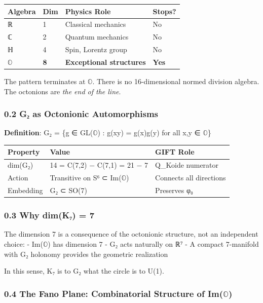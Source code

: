 \documentclass[11pt,a4paper]{article}
\begin{document}
{\def\LTcaptype{none} %
\begin{longtable}[]{@{}llll@{}}
\toprule\noalign{}
Algebra & Dim & Physics Role & Stops? \\
\midrule\noalign{}
\endhead
\bottomrule\noalign{}
\endlastfoot
ℝ & 1 & Classical mechanics & No \\
ℂ & 2 & Quantum mechanics & No \\
ℍ & 4 & Spin, Lorentz group & No \\
\textbf{$\mathbb{O}$} & \textbf{8} & \textbf{Exceptional structures} & \textbf{Yes} \\
\end{longtable}
The pattern terminates at $\mathbb{O}$. There is no 16-dimensional normed division algebra. The octonions are \emph{the end of the line}.

\subsubsection{0.2 G₂ as Octonionic Automorphisms}\label{gux2082-as-octonionic-automorphisms}

\textbf{Definition}: G₂ = \{g ∈ GL($\mathbb{O}$) : g(xy) = g(x)g(y) for all x,y ∈ $\mathbb{O}$\}

{\def\LTcaptype{none} %
\begin{longtable}[]{@{}lll@{}}
\toprule\noalign{}
Property & Value & GIFT Role \\
\midrule\noalign{}
\endhead
\bottomrule\noalign{}
\endlastfoot
dim(G₂) & 14 = C(7,2) − C(7,1) = 21 − 7 & Q\_Koide numerator \\
Action & Transitive on S⁶ ⊂ Im($\mathbb{O}$) & Connects all directions \\
Embedding & G₂ ⊂ SO(7) & Preserves φ₀ \\
\end{longtable}
\subsubsection{0.3 Why dim(K₇) = 7}\label{why-dimkux2087-7}

The dimension 7 is a consequence of the octonionic structure, not an independent choice:
- Im($\mathbb{O}$) has dimension 7
- G₂ acts naturally on ℝ⁷
- A compact 7-manifold with G₂ holonomy provides the geometric realization

In this sense, K₇ is to G₂ what the circle is to U(1).

\subsubsection{0.4 The Fano Plane: Combinatorial Structure of Im($\mathbb{O}$)}\label{the-fano-plane-combinatorial-structure-of-imux1d546}

}}
\end{document}
